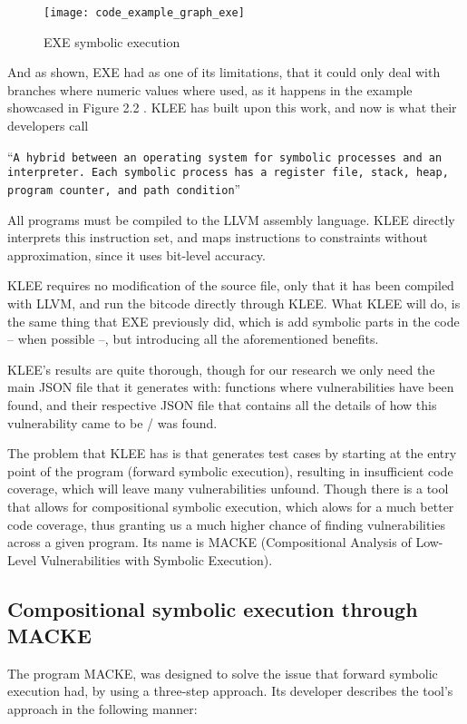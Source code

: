 \begin{figure}[!htb]
	\caption{EXE symbolic execution}
	\centering
	\texttt{[image: code\_example\_graph\_exe]}
\end{figure}

And as shown, EXE had as one of its limitations, that it could only deal with branches where numeric values where used, as it happens in the example showcased in Figure 2.2 . KLEE has built upon this work, and now is what their developers call 

\enquote{\texttt{A hybrid
		between an operating system for symbolic processes and
		an interpreter. Each symbolic process has a register file,
		stack, heap, program counter, and path condition}} \parencite{klee}
	

 All programs must be compiled to the LLVM  assembly language. KLEE directly interprets this instruction set, and maps instructions to constraints without approximation, since it uses bit-level accuracy.\parencite{klee}
 
 KLEE requires no modification of the source file, only that it has been compiled with LLVM, and run the bitcode directly through KLEE. What KLEE will do, is the same thing that EXE previously did, which is add symbolic parts in the code -- when possible --, but introducing all the aforementioned benefits.
 
 KLEE's results are quite thorough, though for our research we only need the main JSON file that it generates with: functions where vulnerabilities have been found, and their respective JSON file that contains all the details of how this vulnerability came to be / was found.
 
 The problem that KLEE has is that generates test cases by starting at the entry point of the program (forward symbolic execution), resulting in insufficient code coverage, which will leave many vulnerabilities unfound. Though there is a tool that allows for compositional symbolic execution, which alows for a much better code coverage, thus granting us a much higher chance of finding vulnerabilities across a given program. Its name is MACKE (Compositional Analysis of Low-Level
 Vulnerabilities with Symbolic Execution). \parencite{ognawala}
 

\subsection{Compositional symbolic execution through MACKE}

The program MACKE, was designed to solve the issue that forward symbolic execution had, by using a three-step approach. Its developer describes the tool's approach in the following manner: 


